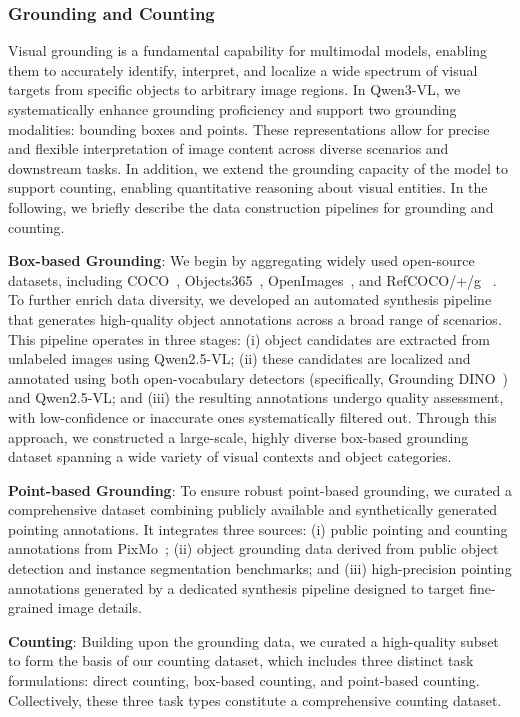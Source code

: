 \documentclass{article} %
\begin{document}
\subsubsection{Grounding and Counting}
Visual grounding is a fundamental capability for multimodal models, enabling them to accurately identify, interpret, and localize a wide spectrum of visual targets from specific objects to arbitrary image regions. In Qwen3-VL, we systematically enhance grounding proficiency and support two grounding modalities: bounding boxes and points. These representations allow for precise and flexible interpretation of image content across diverse scenarios and downstream tasks. In addition, we extend the grounding capacity of the model to support counting, enabling quantitative reasoning about visual entities. In the following, we briefly describe the data construction pipelines for grounding and counting.

\textbf{Box-based Grounding}:
We begin by aggregating widely used open-source datasets, including COCO~\citep{lin2014microsoft}, Objects365~\citep{shao2019objects365}, OpenImages~\citep{kuznetsova2020open}, and RefCOCO/+/g ~\citep{refcoco, refcocog}. To further enrich data diversity, we developed an automated synthesis pipeline that generates high-quality object annotations across a broad range of scenarios. This pipeline operates in three stages:
(i) object candidates are extracted from unlabeled images using Qwen2.5-VL;
(ii) these candidates are localized and annotated using both open-vocabulary detectors (specifically, Grounding DINO~\citep{grounding_dino}) and Qwen2.5-VL; and
(iii) the resulting annotations undergo quality assessment, with low-confidence or inaccurate ones systematically filtered out.
Through this approach, we constructed a large-scale, highly diverse box-based grounding dataset spanning a wide variety of visual contexts and object categories.

\textbf{Point-based Grounding}: 
To ensure robust point-based grounding, we curated a comprehensive dataset combining publicly available and synthetically generated pointing annotations. It integrates three sources:
(i) public pointing and counting annotations from PixMo~\citep{deitke2024molmo};
(ii) object grounding data derived from public object detection and instance segmentation benchmarks; and
(iii) high-precision pointing annotations generated by a dedicated synthesis pipeline designed to target fine-grained image details.

\textbf{Counting}: Building upon the grounding data, we curated a high-quality subset to form the basis of our counting dataset, which includes three distinct task formulations: direct counting, box-based counting, and point-based counting. Collectively, these three task types constitute a comprehensive counting dataset.
\end{document}
